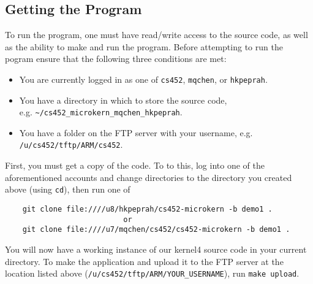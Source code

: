 \documentclass[12pt]{article}
\begin{document}
\subsection{Getting the Program}
To run the program, one must have read/write access to the source code, as well as the ability to make and run the program.  Before attempting to run the pogram ensure that the following three conditions are met:
\begin{itemize}
  \item You are currently logged in as one of \texttt{cs452}, \texttt{mqchen}, or \texttt{hkpeprah}.
  \item You have a directory in which to store the source code, \\ e.g. \texttt{\textasciitilde/cs452\_microkern\_mqchen\_hkpeprah}.
  \item You have a folder on the FTP server with your username, e.g. \texttt{/u/cs452/tftp/ARM/cs452}.
\end{itemize}
First, you must get a copy of the code.  To to this, log into one of the aforementioned accounts and change directories to the directory you created above (using \texttt{cd}), then run one of
\begin{center}
  \begin{verbatim}
    git clone file:////u8/hkpeprah/cs452-microkern -b demo1 .
                           or
    git clone file:////u7/mqchen/cs452/cs452-microkern -b demo1 .
  \end{verbatim}
\end{center}
\vspace{-0.5cm}You will now have a working instance of our kernel4 source code in your current directory.  To make the application and upload it to the FTP server at the location listed above (\texttt{/u/cs452/tftp/ARM/YOUR\_USERNAME}), run \texttt{make upload}.
\\[1\baselineskip]
\end{document}
